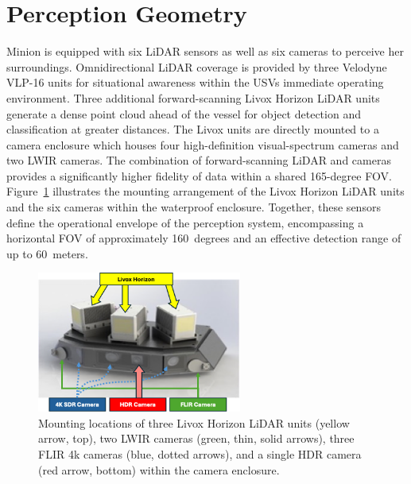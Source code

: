 \documentclass[../main.tex]{subfiles}
\begin{document}
\section{Perception Geometry} \label{perception_geometry}

Minion is equipped with six \ac{LiDAR} sensors as well as six cameras to perceive her surroundings.
Omnidirectional \ac{LiDAR} coverage is provided by three Velodyne VLP-16 units for situational awareness within the \acp{USV} immediate operating environment.
Three additional forward-scanning Livox Horizon \ac{LiDAR} units generate a dense point cloud ahead of the vessel for object detection and classification at greater distances.
The Livox units are directly mounted to a camera enclosure which houses four high-definition visual-spectrum cameras and two \ac{LWIR} cameras.
The combination of forward-scanning LiDAR and cameras provides a significantly higher fidelity of data within a shared 165-degree \ac{FOV}. %
Figure~\ref{fig:camera_enclosure} illustrates the mounting arrangement of the Livox Horizon LiDAR units and the six cameras within the waterproof enclosure.
Together, these sensors define the operational envelope of the perception system, encompassing a horizontal \ac{FOV} of approximately 160~degrees and an effective detection range of up to 60~meters.

\begin{figure}[htbp]
\centering
\includegraphics[width=0.6\textwidth]{Images/Camera_enclosure2.png}
\caption{Mounting locations of three Livox Horizon LiDAR units (yellow arrow, top), two LWIR cameras (green, thin, solid arrows), three FLIR 4k cameras (blue, dotted arrows), and a single \ac{HDR} camera  (red arrow, bottom) within the camera enclosure.}
\label{fig:camera_enclosure}
\end{figure}
\end{document}

